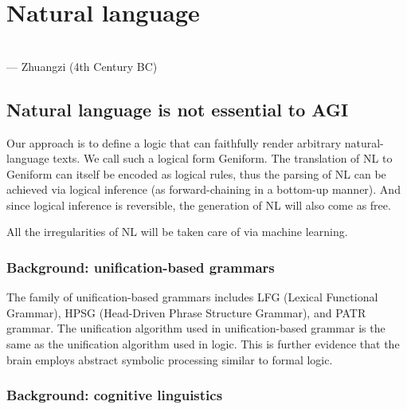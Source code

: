 \chapter{Natural language}
\label{ch:natural-language}
\begin{flushright}
\\ --- Zhuangzi (4th Century BC)
\end{flushright}
\minitoc

\section{Natural language is not essential to AGI}

Our approach is to define a logic that can faithfully render arbitrary natural-language texts.  We call such a logical form Geniform.  The translation of NL to Geniform can itself be encoded as logical rules, thus the parsing of NL can be achieved via logical inference (as forward-chaining in a bottom-up manner).  And since logical inference is reversible, the generation of NL will also come as free.

All the irregularities of NL will be taken care of via machine learning.

\subsection{Background: unification-based grammars}

The family of unification-based grammars includes LFG (Lexical Functional Grammar), HPSG (Head-Driven Phrase Structure Grammar), and PATR grammar.  The unification algorithm used in unification-based grammar is the same as the unification algorithm used in logic.  This is further evidence that the brain employs abstract symbolic processing similar to formal logic.

\subsection{Background: cognitive linguistics}


